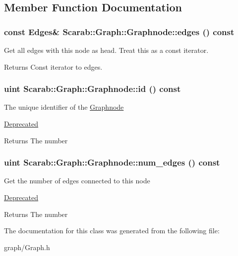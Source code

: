 \subsection{Member Function Documentation}
\hypertarget{classScarab_1_1Graph_1_1Graphnode_a4ffd990052c812242cbdeeae7b0e1104}{
\subsubsection[{edges}]{\setlength{\rightskip}{0pt plus 5cm}const Edges\& Scarab::Graph::Graphnode::edges () const}}
\label{classScarab_1_1Graph_1_1Graphnode_a4ffd990052c812242cbdeeae7b0e1104}
Get all edges with this node as head. Treat this as a const iterator. \begin{DoxyReturn}{Returns}
Const iterator to edges. 
\end{DoxyReturn}
\hypertarget{classScarab_1_1Graph_1_1Graphnode_a74eaaed5d31a0a2c0445f3de0859148f}{
\subsubsection[{id}]{\setlength{\rightskip}{0pt plus 5cm}uint Scarab::Graph::Graphnode::id () const}}
\label{classScarab_1_1Graph_1_1Graphnode_a74eaaed5d31a0a2c0445f3de0859148f}
The unique identifier of the \hyperlink{classScarab_1_1Graph_1_1Graphnode}{Graphnode} \begin{Desc}
\item[\hyperlink{deprecated__deprecated000001}{Deprecated}]\end{Desc}
\begin{DoxyReturn}{Returns}
The number 
\end{DoxyReturn}
\hypertarget{classScarab_1_1Graph_1_1Graphnode_a78229cc45113d24f1373a50a13bc7be4}{
\subsubsection[{num\_\-edges}]{\setlength{\rightskip}{0pt plus 5cm}uint Scarab::Graph::Graphnode::num\_\-edges () const}}
\label{classScarab_1_1Graph_1_1Graphnode_a78229cc45113d24f1373a50a13bc7be4}
Get the number of edges connected to this node \begin{Desc}
\item[\hyperlink{deprecated__deprecated000002}{Deprecated}]\end{Desc}
\begin{DoxyReturn}{Returns}
The number 
\end{DoxyReturn}


The documentation for this class was generated from the following file:\begin{DoxyCompactItemize}
\item 
graph/Graph.h\end{DoxyCompactItemize}
